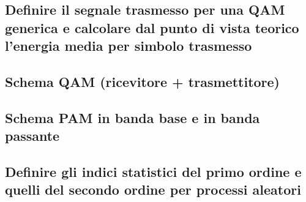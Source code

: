 \documentclass[12pt,oneside,openany]{memoir}
\numberwithin{equation}{subsection}
\begin{document}

\newpage
\subsection{Definire il segnale trasmesso per una QAM generica e calcolare dal
punto di vista teorico l'energia media per simbolo trasmesso}


\newpage
\subsection{Schema QAM (ricevitore + trasmettitore)}


\newpage
\subsection{Schema PAM in banda base e in banda passante}


\newpage
\subsection{Definire gli indici statistici del primo ordine e quelli del secondo
ordine per processi aleatori}

\end{document}

